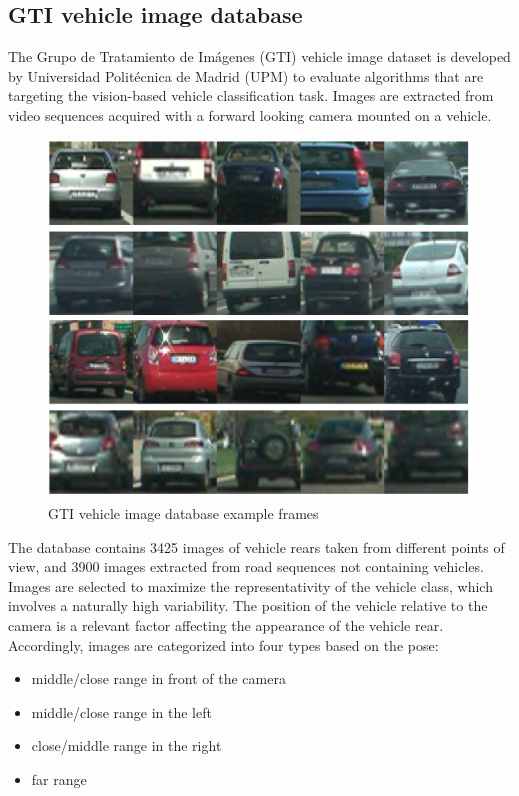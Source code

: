 \subsection{GTI vehicle image database}
The Grupo de Tratamiento de Imágenes (GTI) vehicle image dataset is developed by Universidad Politécnica de Madrid (UPM) to evaluate algorithms that are targeting the vision-based vehicle classification task. Images are extracted from video sequences acquired with a forward looking camera mounted on a vehicle.

\begin{figure}[ht]
\includegraphics[trim={0cm 0cm 0cm 0cm},clip,width=\linewidth]{Figures/GTI.png}
\centering
\caption{GTI vehicle image database example frames \cite{gti}}
\label{gti}
\end{figure}

The database contains 3425 images of vehicle rears taken from different points of view, and 3900 images extracted from road sequences not containing vehicles. Images are selected to maximize the representativity of the vehicle class, which involves a naturally high variability. The position of the vehicle relative to the camera is a relevant factor affecting the appearance of the vehicle rear. Accordingly, images are categorized into four types based on the pose:

\begin{itemize}
\item middle/close range in front of the camera
\item middle/close range in the left
\item close/middle range in the right
\item far range
\end{itemize}

